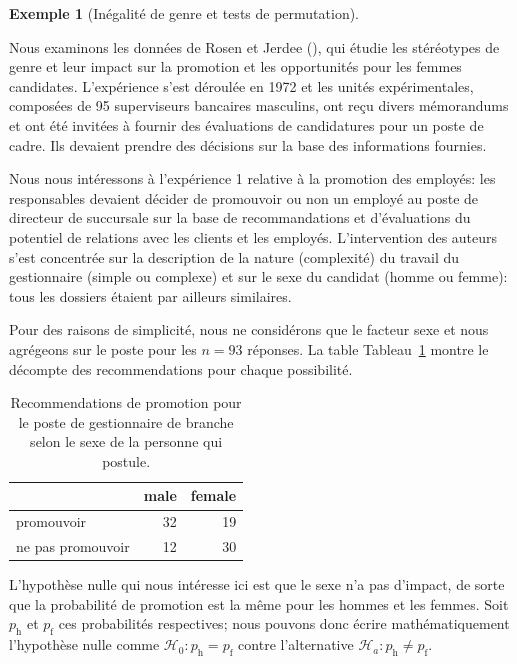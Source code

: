 \documentclass[
  11pt,
  letterpaper,
]{scrbook}
\theoremstyle{plain}
\theoremstyle{plain}
\theoremstyle{definition}
\newtheorem{example}{Exemple}[chapter]
\theoremstyle{definition}
\theoremstyle{remark}
\begin{document}
\begin{example}[Inégalité de genre et tests de
permutation]\protect\hypertarget{exm-rosenjerdee74}{}\label{exm-rosenjerdee74}

Nous examinons les données de Rosen et Jerdee
(), qui étudie les stéréotypes de genre
et leur impact sur la promotion et les opportunités pour les femmes
candidates. L'expérience s'est déroulée en 1972 et les unités
expérimentales, composées de 95 superviseurs bancaires masculins, ont
reçu divers mémorandums et ont été invitées à fournir des évaluations de
candidatures pour un poste de cadre. Ils devaient prendre des décisions
sur la base des informations fournies.

Nous nous intéressons à l'expérience 1 relative à la promotion des
employés: les responsables devaient décider de promouvoir ou non un
employé au poste de directeur de succursale sur la base de
recommandations et d'évaluations du potentiel de relations avec les
clients et les employés. L'intervention des auteurs s'est concentrée sur
la description de la nature (complexité) du travail du gestionnaire
(simple ou complexe) et sur le sexe du candidat (homme ou femme): tous
les dossiers étaient par ailleurs similaires.

Pour des raisons de simplicité, nous ne considérons que le facteur sexe
et nous agrégeons sur le poste pour les \(n=93\) réponses. La table
Tableau~\ref{tbl-rosen-table1} montre le décompte des recommendations
pour chaque possibilité.

\begin{longtable}[t]{lrr}

\caption{\label{tbl-rosen-table1}Recommendations de promotion pour le
poste de gestionnaire de branche selon le sexe de la personne qui
postule.}

\tabularnewline

\toprule
 & male & female\\
\midrule
promouvoir & 32 & 19\\
ne pas promouvoir & 12 & 30\\
\bottomrule

\end{longtable}

L'hypothèse nulle qui nous intéresse ici est que le sexe n'a pas
d'impact, de sorte que la probabilité de promotion est la même pour les
hommes et les femmes. Soit \(p_{\text{h}}\) et \(p_{\text{f}}\) ces
probabilités respectives; nous pouvons donc écrire mathématiquement
l'hypothèse nulle comme \(\mathscr{H}_0: p_{\text{h}} = p_{\text{f}}\)
contre l'alternative \(\mathscr{H}_a: p_{\text{h}} \neq p_{\text{f}}.\)


\end{example}
\end{document}

